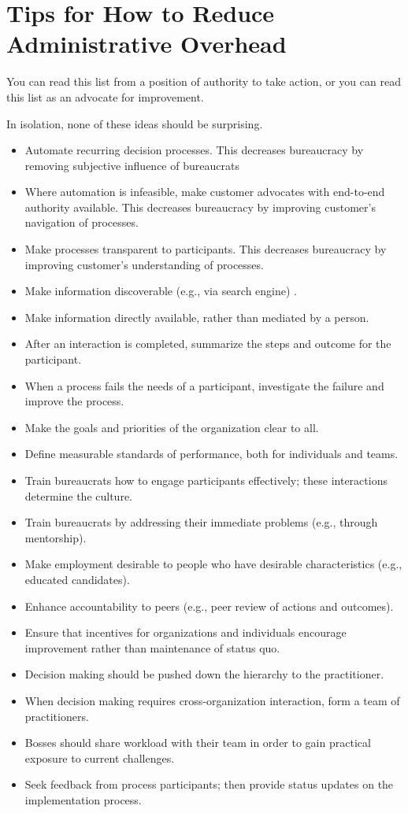 \section{Tips for How to Reduce Administrative Overhead\label{sec:reducing_overhead}}

You can read this list from a position of authority to take action, or you can read this list as an advocate for improvement. 

In isolation, none of these ideas should be surprising.
\begin{itemize}
    \item Automate recurring decision processes. This decreases bureaucracy by removing subjective influence of bureaucrats
\item Where automation is infeasible, make customer advocates with end-to-end authority available. 
This decreases bureaucracy by improving customer's navigation of processes.
\item Make processes transparent to participants. 
This decreases bureaucracy by improving customer's understanding of processes.
\item Make information discoverable (e.g., via search engine) .
\item Make information directly available, rather than mediated by a person.
\item After an interaction is completed, summarize the steps and outcome for the participant. 
\item When a process fails the needs of a participant, investigate the failure and improve the process.
\item Make the goals and priorities of the organization clear to all.
\item Define measurable standards of performance, both for individuals and teams.
\item Train bureaucrats how to engage participants effectively; these interactions determine the culture.
\item Train bureaucrats by addressing their immediate problems (e.g., through mentorship).
\item Make employment desirable to people who have desirable characteristics (e.g., educated candidates).
\item Enhance accountability to peers (e.g., peer review of actions and outcomes).
\item Ensure that incentives for organizations and individuals encourage improvement rather than maintenance of status quo.
\item Decision making should be pushed down the hierarchy to the practitioner.
\item When decision making requires cross-organization interaction, form a team of practitioners.
\item Bosses should share workload with their team in order to gain practical exposure to current challenges.
\item Seek feedback from process participants; then provide status updates on the implementation process.


\end{itemize}
